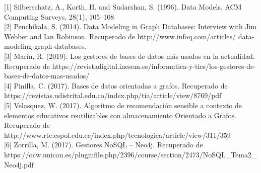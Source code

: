 \documentclass[preprint,12pt]{elsarticle}
\begin{document}
[1] Silberschatz, A., Korth, H. and Sudarshan, S. (1996).
Data Models. ACM Computing Surveys, 28(1),
105–108 \\

[2] Penchikala, S. (2014). Data Modeling in Graph Databases: Interview with Jim Webber and Ian Robinson. Recuperado de http://www.infoq.com/articles/
data-modeling-graph-databases. \\

[3] Marín, R. (2019). Los gestores de bases de datos más usados en la actualidad. Recuperado de https://revistadigital.inesem.es/informatica-y-tics/los-gestores-de-bases-de-datos-mas-usados/ \\

[4] Pinilla, C. (2017). Bases de datos orientadas a grafos. Recuperado de https://revistas.udistrital.edu.co/index.php/tia/article/view/8769/pdf \\

[5] Velasquez, W. (2017). Algoritmo de recomendación sensible a contexto de elementos educativos reutilizables con almacenamiento Orientado a Grafos. Recuperado de http://www.rte.espol.edu.ec/index.php/tecnologica/article/view/311/359 \\

[6] Zorrilla, M. (2017). Gestores NoSQL – Neo4j. Recuperado de https://ocw.unican.es/pluginfile.php/2396/course/section/2473/NoSQL\_Tema2\_Neo4j.pdf \\
	


	
\end{document}
